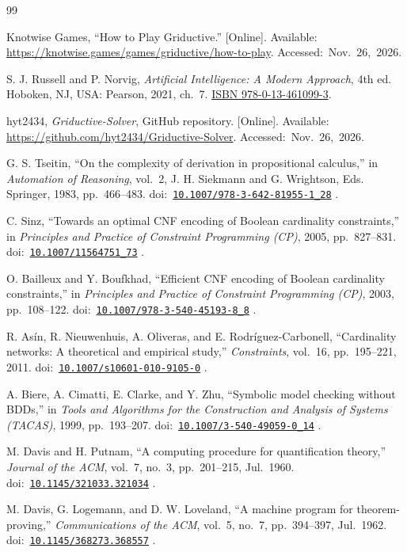 \documentclass[11pt,a4paper]{article}
\newcommand{\doiref}[1]{%
  \mbox{doi: \href{https://doi.org/#1}{\nolinkurl{#1}}}%
}
\begin{document}
\begin{thebibliography}{99}
\raggedright

Knotwise Games, “How to Play Griductive.”
[Online]. Available:
\url{https://knotwise.games/games/griductive/how-to-play}.
\mbox{Accessed: Nov.~26, 2026.}

S. J. Russell and P. Norvig,
\emph{Artificial Intelligence: A Modern Approach}, 4th ed.
Hoboken, NJ, USA: Pearson, 2021, ch.~7.
\href{https://aima.cs.berkeley.edu/~russell/aima/newchap00.pdf}
{ISBN 978-0-13-461099-3}.

hyt2434, \emph{Griductive-Solver}, GitHub repository.
[Online]. Available:
\url{https://github.com/hyt2434/Griductive-Solver}.
\mbox{Accessed: Nov.~26, 2026.}

G. S. Tseitin,
“On the complexity of derivation in propositional calculus,”
in \emph{Automation of Reasoning}, vol.~2,
J. H. Siekmann and G. Wrightson, Eds.
Springer, 1983, pp.~466--483.
\doiref{10.1007/978-3-642-81955-1_28}.

C. Sinz,
“Towards an optimal CNF encoding of Boolean cardinality constraints,”
in \emph{Principles and Practice of Constraint Programming (CP)},
2005, pp.~827--831.
\doiref{10.1007/11564751_73}.

O. Bailleux and Y. Boufkhad,
“Efficient CNF encoding of Boolean cardinality constraints,”
in \emph{Principles and Practice of Constraint Programming (CP)},
2003, pp.~108--122.
\doiref{10.1007/978-3-540-45193-8_8}.

R. Asín, R. Nieuwenhuis, A. Oliveras,
and E. Rodríguez-Carbonell,
“Cardinality networks: A theoretical and empirical study,”
\emph{Constraints}, vol.~16, pp.~195--221, 2011.
\doiref{10.1007/s10601-010-9105-0}.

A. Biere, A. Cimatti, E. Clarke, and Y. Zhu,
“Symbolic model checking without BDDs,”
in \emph{Tools and Algorithms for the Construction and Analysis
of Systems (TACAS)},
1999, pp.~193--207.
\doiref{10.1007/3-540-49059-0_14}.

M. Davis and H. Putnam,
“A computing procedure for quantification theory,”
\emph{Journal of the ACM}, vol.~7, no.~3,
pp.~201--215, Jul.~1960.
\doiref{10.1145/321033.321034}.

M. Davis, G. Logemann, and D. W. Loveland,
“A machine program for theorem-proving,”
\emph{Communications of the ACM}, vol.~5, no.~7,
pp.~394--397, Jul.~1962.
\doiref{10.1145/368273.368557}.


\end{thebibliography}
\end{document}
